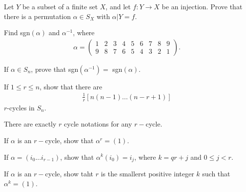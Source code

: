 \documentclass[15pt]{article}
\newenvironment{exercise}[2][Exercise]{\begin{trivlist}
\item[\hskip \labelsep {\bfseries #1}\hskip \labelsep {\bfseries #2.}]}
{\end{trivlist}}
\newenvironment{hint}[2][Hint]{\begin{trivlist}
    \item[\hskip \labelsep {\bfseries #1}\hskip \labelsep {\bfseries #2.}]}
    {\end{trivlist}}
\begin{document}
\begin{exercise}{1.9}

    Let $Y$ be a subset of a finite set $X$, and let $f:Y\rightarrow X$ be an injection. Prove that there is a permutation $\alpha \in S_X$ with $\alpha |Y =f$.

    
\end{exercise}


\begin{exercise}{1.10}

    Find sgn$(\alpha)$ and $\alpha^{-1}$, where 
    \begin{align*}
        \alpha = \begin{pmatrix}
            1&2&3&4&5&6&7&8&9\\9&8&7&6&5&4&3&2&1
        \end{pmatrix}.
    \end{align*}
    
\end{exercise}


\begin{exercise}{1.11}

    If $\alpha\in S_n$, prove that sgn$(\alpha^{-1}) =$ sgn$(\alpha)$.
    
\end{exercise}



\begin{exercise}{1.12}

    If $1\leq r \leq n$, show that there are 
    \begin{align*}
        \frac{1}r [n(n-1)...(n-r+1)]
    \end{align*} 
    $r$-cycles in $S_n$.

    \begin{hint}{}
        There are exactly $r$ cycle notations for any $r-$cycle.
    \end{hint}

\end{exercise}

\begin{exercise}{1.13}

    \begin{enumerate}
        \item[(i)] If $\alpha$ is an $r-$cycle, show that $\alpha^r =(1)$.
        \begin{hint}{}
            If $\alpha=(i_0...i_{r-1})$, show that $\alpha^k(i_0) = i_j$, where $k=qr+j$ and $0\leq j < r$.
        \end{hint}
        \item[(ii)] If $\alpha$ is an $r-$cycle, show taht $r$ is the smallerst positive integer $k$ such that $\alpha^k=(1)$.
    \end{enumerate}

\end{exercise}
\end{document}
